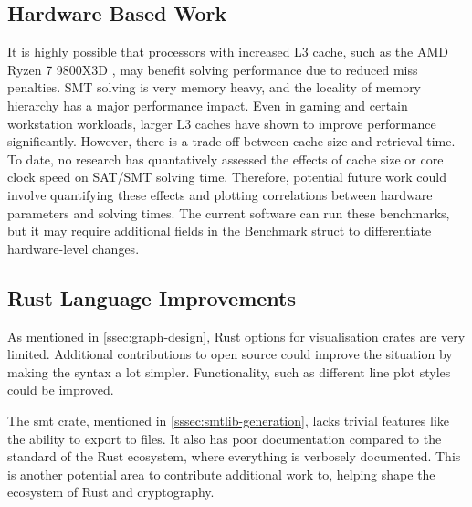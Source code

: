 \documentclass[a4paper]{report}
\begin{document}
\subsection{Hardware Based Work}
\label{ssec:future-hardware}
It is highly possible that processors with increased L3 cache, such as the AMD Ryzen 7 9800X3D \cite{AMD_R7_9800X3D}, may benefit solving performance due to reduced miss penalties.
SMT solving is very memory heavy, and the locality of memory hierarchy has a major performance impact.
Even in gaming and certain workstation workloads, larger L3 caches have shown to improve performance significantly. \cite{gamersnexus}
However, there is a trade-off between cache size and retrieval time. \cite{shanthi_nd}
To date, no research has quantatively assessed the effects of cache size or core clock speed on SAT/SMT solving time.
Therefore, potential future work could involve quantifying these effects and plotting correlations between hardware parameters and solving times.
The current software can run these benchmarks, but it may require additional fields in the Benchmark struct to differentiate hardware-level changes.

\subsection{Rust Language Improvements}
\label{ssec:rust-improvements}
As mentioned in \ref{ssec:graph-design}, Rust options for visualisation crates are very limited.
Additional contributions to open source could improve the situation by making the syntax a lot simpler.
Functionality, such as different line plot styles could be improved.

The smt crate, mentioned in \ref{sssec:smtlib-generation}, lacks trivial features like the ability to export to files.
It also has poor documentation compared to the standard of the Rust ecosystem, where everything is verbosely documented.
This is another potential area to contribute additional work to, helping shape the ecosystem of Rust and cryptography.


\glsaddall
\printglossaries




\end{document}
